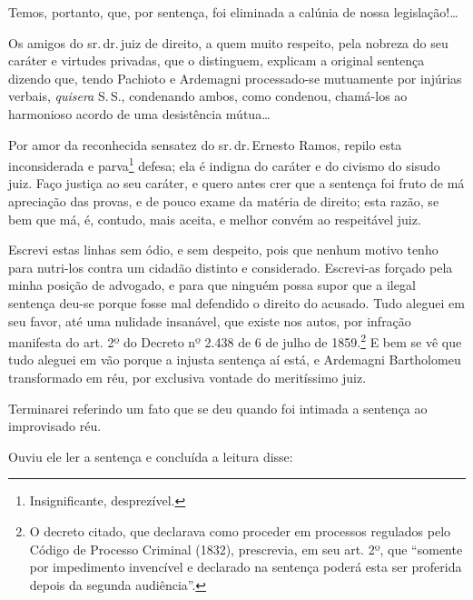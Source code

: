 Temos, portanto, que, por sentença, foi eliminada a calúnia de nossa
legislação!\ldots{}

Os amigos do sr.\,dr.\,juiz de direito, a quem muito respeito, pela
nobreza do seu caráter e virtudes privadas, que o distinguem, explicam a
original sentença dizendo que, tendo Pachioto e Ardemagni processado-se
mutuamente por injúrias verbais, \emph{quisera} S.\,S., condenando ambos,
como condenou, chamá-los ao harmonioso acordo de uma desistência
mútua\ldots{}

Por amor da reconhecida sensatez do sr.\,dr.\,Ernesto Ramos, repilo esta
inconsiderada e parva\footnote{ Insignificante, desprezível.} defesa;
ela é indigna do caráter e do civismo do sisudo juiz. Faço justiça ao
seu caráter, e quero antes crer que a sentença foi fruto de má
apreciação das provas, e de pouco exame da matéria de direito; esta
razão, se bem que má, é, contudo, mais aceita, e melhor convém ao
respeitável juiz.

Escrevi estas linhas sem ódio, e sem despeito, pois que nenhum motivo
tenho para nutri-los contra um cidadão distinto e considerado.
Escrevi-as forçado pela minha posição de advogado, e para que ninguém
possa supor que a ilegal sentença deu-se porque fosse mal defendido o
direito do acusado. Tudo aleguei em seu favor, até uma nulidade
insanável, que existe nos autos, por infração manifesta do art. 2º do
Decreto nº 2.438 de 6 de julho de 1859.\footnote{ O decreto citado, que
  declarava como proceder em processos regulados pelo Código de Processo
  Criminal (1832), prescrevia, em seu art. 2º, que ``somente por
  impedimento invencível e declarado na sentença poderá esta ser
  proferida depois da segunda audiência''.} E bem se vê que tudo aleguei
em vão porque a injusta sentença aí está, e Ardemagni Bartholomeu
transformado em réu, por exclusiva vontade do meritíssimo juiz.

Terminarei referindo um fato que se deu quando foi intimada a sentença
ao improvisado réu.

Ouviu ele ler a sentença e concluída a leitura disse:

